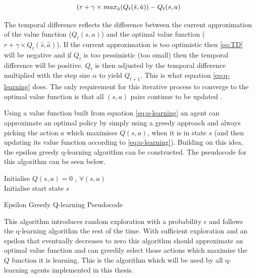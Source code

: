 \begin{equation}\label{eq:TD}
(r + \gamma \times max_{\hat{a}}(Q_t(\hat{s},\hat{a})) - Q_t(s,a)\\
\end{equation}

The temporal difference reflects the difference between the current approximation of the value function ($Q_t(s,a)$) and the optimal value function ($r + \gamma \times Q_t(\hat{s},\hat{a})$). If the current approximation is too optimistic then \ref{eq:TD} will be negative and if $Q_t$ is too pessimistic (too small) then the temporal difference will be positive. $Q_t$ is then adjusted by the temporal difference multiplied with the step size $\alpha$ to yield $Q_{t+1}$. This is what equation \ref{eq:q-learning} does. The only requirement for this iterative process to converge to the optimal value function is that all $(s,a)$ pairs continue to be updated \cite{sutton_barto}.

Using a value function built from equation \ref{eq:q-learning} an agent can approximate an optimal policy by simply using a greedy approach and always picking the action $a$ which maximises $Q(s,a)$, when it is in state $s$ (and then updating its value function according to \ref{eq:q-learning}). Building on this idea, the epsilon greedy q-learning algorithm can be constructed. The pseudocode for this algorithm can be seen below.
\begin{algorithm}[h]
Initialise $Q(s,a) = 0$ , $\forall (s,a)$\\
Initialise start state $s$\\
\caption{Epsilon Greedy Q-learning Pseudocode}
\label{alg:q-learning}
\end{algorithm}

This algorithm introduces random exploration with a probability $\epsilon$ and follows the q-learning algorithm the rest of the time. With sufficient exploration and an epsilon that eventually decreases to zero this algorithm should approximate an optimal value function and can greedily select those actions which maximise the $Q$ function it is learning. This is the algorithm which will be used by all q-learning agents implemented in this thesis. 

